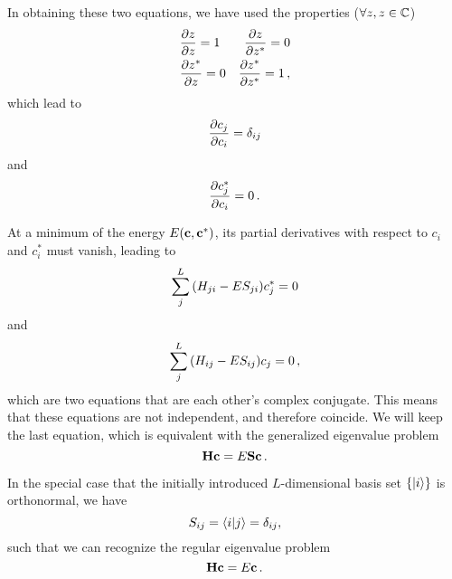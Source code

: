     In obtaining these two equations, we have used the properties \cite{Remmert2010} ($\forall z, z \in \mathbb{C}$)
    \begin{align}
        &\pdv{z}{z} = 1     &\pdv{z}{z^*} = 0 \\
        &\pdv{z^*}{z} = 0   &\pdv{z^*}{z^*} = 1 \thinspace ,
    \end{align}
    which lead to
    \begin{equation}
        \pdv{c_j}{c_i} = \delta_{ij}
    \end{equation}
    and
    \begin{equation}
        \pdv{c_j^*}{c_i} = 0 \thinspace .
    \end{equation}

    At a minimum of the energy $E(\vb{c}, \vb{c}^*)$, its partial derivatives with respect to $c_i$ and $c_i^*$ must vanish, leading to
    \begin{equation}
        \sum_j^L \qty(H_{ji} - E S_{ji}) c_j^* = 0
    \end{equation}
    and
    \begin{equation}
        \sum_j^L \qty(H_{ij} - E S_{ij}) c_j = 0 \thinspace ,
    \end{equation}
    which are two equations that are each other's complex conjugate. This means that these equations are not independent, and therefore coincide. We will keep the last equation, which is equivalent with the generalized eigenvalue problem
    \begin{equation}
        \vb{H} \vb{c} = E \vb{S} \vb{c} \thinspace .
    \end{equation}

    In the special case that the initially introduced $L$-dimensional basis set $\qty{\ket{i}}$ is orthonormal, we have
    \begin{equation}
        S_{ij} = \braket{i}{j} = \delta_{ij} ,
    \end{equation}
    such that we can recognize the regular eigenvalue problem
    \begin{equation}
        \vb{H} \vb{c} = E \vb{c} \thinspace .
    \end{equation}
